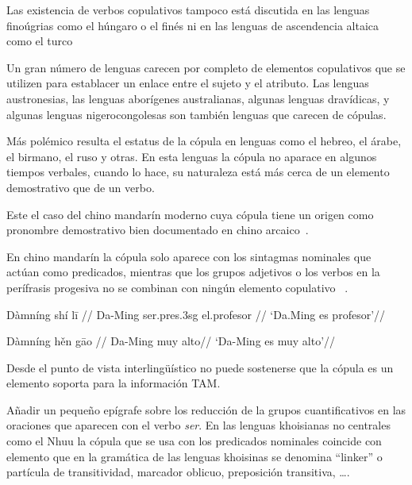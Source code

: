 Las existencia de verbos copulativos tampoco está discutida en las lenguas finoúgrias como el húngaro o el finés ni en las lenguas de ascendencia altaica como el turco


Un gran número de lenguas carecen por completo de elementos copulativos que se utilizen para establacer un enlace entre el sujeto y el atributo. Las lenguas austronesias, las lenguas aborígenes australianas, algunas lenguas dravídicas, y algunas lenguas nigerocongolesas son también lenguas que carecen de cópulas.

Más polémico resulta el estatus de la cópula en lenguas como el hebreo, el árabe, el birmano, el ruso y otras. En esta lenguas la cópula no aparace en algunos tiempos verbales, cuando lo hace, su naturaleza está más cerca de un elemento demostrativo que de un verbo. 


Este el caso del chino mandarín moderno cuya cópula tiene un origen como pronombre demostrativo bien documentado en chino arcaico~\parencites{Li1977Mechanismdevelopmentcopula}{Lohndal2009Copula-cycle}{Gelderen2011The-Pronominal}.

 En chino mandarín la cópula solo aparece con los sintagmas nominales que actúan como predicados, mientras que los grupos adjetivos o los verbos en la perífrasis progesiva no se combinan con ningún elemento copulativo ~\parencites{Pustet2003Copulas-univer}.
 
 
 \ex[glspace=!1em,everygla={},everyglb={},aboveglbskip=-.2ex]
\begingl
\gla Dàmníng shí l\={i} //
\glb Da-Ming ser.{\sc pres}.{\sc 3sg} el.profesor  //
\glft ‘Da.Ming es profesor’//
\endgl
\xe
 
\ex[glspace=!1em,everygla={},everyglb={},aboveglbskip=-.2ex]
\begingl
\gla Dàmníng h\v{e}n g\={a}o //
\glb Da-Ming {} muy alto//
\glft ‘Da-Ming es muy alto’//
\endgl
\xe
 
  




Desde el punto de vista interlingüístico no puede sostenerse que la cópula es un elemento soporta para la información TAM.



Añadir un pequeño epígrafe sobre los reducción de la grupos cuantificativos en las oraciones que aparecen con el verbo \textit{ser}. En las lenguas khoisianas no centrales como el Nhuu la cópula que se usa con los predicados nominales coincide con elemento que en la gramática de las lenguas khoisinas se denomina \enquote{linker} o partícula de transitividad, marcador oblicuo, preposición transitiva, \ldots.


